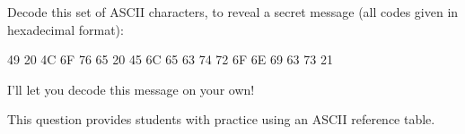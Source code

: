 

Decode this set of ASCII characters, to reveal a secret message (all codes given in hexadecimal format):

\vskip 10pt

\hskip 30pt 49 20 4C 6F 76 65 20 45 6C 65 63 74 72 6F 6E 69 63 73 21 

\vskip 10pt







I'll let you decode this message on your own!







This question provides students with practice using an ASCII reference table.





